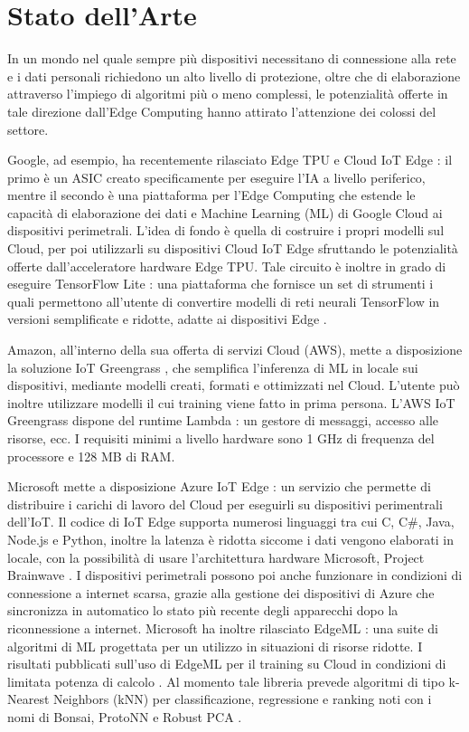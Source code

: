 \chapter{Stato dell'Arte}
In un mondo nel quale sempre più dispositivi necessitano di connessione alla rete e i dati personali richiedono un alto livello di protezione, oltre che di elaborazione attraverso l'impiego di algoritmi più o meno complessi, le potenzialità offerte in tale direzione dall'Edge Computing hanno attirato l'attenzione dei colossi del settore.

Google, ad esempio, ha recentemente rilasciato Edge TPU e Cloud IoT Edge \cite{iotgoogle}: il primo è un ASIC creato specificamente per eseguire l'IA a livello periferico, mentre il secondo è una piattaforma per l'Edge Computing che estende le capacità di elaborazione dei dati e Machine Learning (ML) di Google Cloud ai dispositivi perimetrali. L'idea di fondo è quella di costruire i propri modelli sul Cloud, per poi utilizzarli su dispositivi Cloud IoT Edge sfruttando le potenzialità offerte dall'acceleratore hardware Edge TPU. Tale circuito è inoltre in grado di eseguire TensorFlow Lite \cite{tflowlite}: una piattaforma che fornisce un set di strumenti i quali permettono all'utente di convertire modelli di reti neurali TensorFlow in versioni semplificate e ridotte, adatte ai dispositivi Edge \cite{tflowres}.

Amazon, all'interno della sua offerta di servizi Cloud (AWS), mette a disposizione la soluzione IoT Greengrass \cite{aws}, che semplifica l'inferenza di ML in locale sui dispositivi, mediante modelli creati, formati e ottimizzati nel Cloud. L'utente può inoltre utilizzare modelli il cui training viene fatto in prima persona. L'AWS IoT Greengrass dispone del runtime Lambda \cite{lambda}: un gestore di messaggi, accesso alle risorse, ecc. I requisiti minimi a livello hardware sono 1 GHz di frequenza del processore e 128 MB di RAM.

Microsoft mette a disposizione Azure IoT Edge \cite{azure}: un servizio che permette di distribuire i carichi di lavoro del Cloud per eseguirli su dispositivi perimentrali dell'IoT. Il codice di IoT Edge supporta numerosi linguaggi tra cui C, C\#, Java, Node.js e Python, inoltre la latenza è ridotta siccome i dati vengono elaborati in locale, con la possibilità di usare l'architettura hardware Microsoft, Project Brainwave \cite{bwave}. I dispositivi perimetrali possono poi anche funzionare in condizioni di connessione a internet scarsa, grazie alla gestione dei dispositivi di Azure che sincronizza in automatico lo stato più recente degli apparecchi dopo la riconnessione a internet. Microsoft ha inoltre rilasciato EdgeML \cite{edgeml}: una suite di algoritmi di ML progettata per un utilizzo in situazioni di risorse ridotte. I risultati pubblicati sull'uso di EdgeML per il training su Cloud in condizioni di limitata potenza di calcolo \cite{edgemlres}. Al momento tale libreria prevede algoritmi di tipo k-Nearest Neighbors (kNN) per classificazione, regressione e ranking noti con i nomi di Bonsai, ProtoNN e Robust PCA \cite{edgemlalg}.

